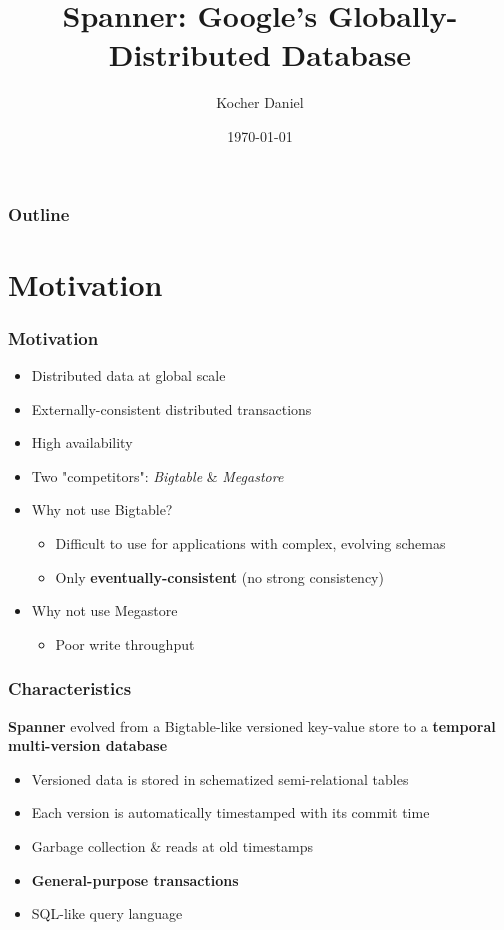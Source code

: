 \documentclass{beamer}
\title[]{Spanner: Google's Globally-Distributed Database}
\subtitle[]{}
\author{Kocher Daniel}
\institute[PLUS] 
{
Summarizing Talk \newline
Efficent Algorithms Seminar \newline
University of Salzburg
}
\date{\today}
\begin{document}
\begin{frame}
\titlepage
\end{frame}

\begin{frame}
\frametitle{Outline} 
\tableofcontents[hideallsubsections]
\end{frame}

\section{Motivation}
\begin{frame}
	\frametitle{Motivation}
	\begin{itemize}
    \item{Distributed data at global scale}
    \item{Externally-consistent distributed transactions}
    \item{High availability}
    \item{Two "competitors": \emph{Bigtable} \& \emph{Megastore}}
    \pause
    \item{Why not use Bigtable?}
    \begin{itemize}
      \item{Difficult to use for applications with complex, evolving schemas}
      \item{Only \textbf{eventually-consistent} (no strong consistency)}
    \end{itemize}
    \pause
    \item{Why not use Megastore}
    \begin{itemize}
      \item{Poor write throughput}
    \end{itemize}
    
  \end{itemize}
\end{frame}

\begin{frame}
  \frametitle{Characteristics}
  \begin{center}
    \textbf{Spanner} evolved from a Bigtable-like versioned key-value store to a
    \textbf{temporal multi-version database}
  \end{center}
  \pause
  \begin{itemize}
    \item{Versioned data is stored in schematized semi-relational tables}
    \item{Each version is automatically timestamped with its commit time}
    \item{Garbage collection \& reads at old timestamps}
    \item{\textbf{General-purpose transactions}}
    \item{SQL-like query language}
  \end{itemize}
\end{frame}
\end{document}
